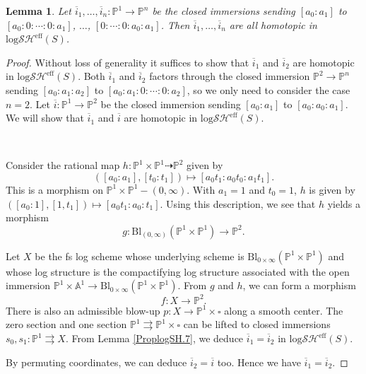 \documentclass[11pt, a4paper]{amsart}
\newtheorem{lem}[thm]{Lemma}
\theoremstyle{definition}
\numberwithin{equation}{subsection}
\renewcommand{\P}{\mathbb{P}}
\newcommand{\A}{\mathbb{A}}
\newcommand{\Blow}{{\mathrm{Bl}}}
\newcommand{\ol}{\overline}
\newcommand{\boxx}{\square}
\newcommand{\inflogSHS}{\mathrm{log}\mathcal{SH}^{\mathrm{eff}}}
\begin{document}
\begin{lem}
\label{Ori.6}
Let $\ol{i}_1,\ldots,\ol{i}_n\colon \P^1\to \P^n$ be the closed immersions sending $[a_0:a_1]$ to $[a_0:0:\cdots :0:a_1]$, $\ldots$, $[0:\cdots:0:a_0:a_1]$.
Then $\ol{i}_1,\ldots,\ol{i}_n$ are all homotopic in $\inflogSHS(S)$.
\end{lem}
\begin{proof}
Without loss of generality it suffices to show that $\ol{i}_1$ and $\ol{i}_2$ are homotopic in $\inflogSHS(S)$.
Both $\ol{i}_1$ and $\ol{i}_2$ factors through the closed immersion $\P^2\to \P^n$ sending $[a_0:a_1:a_2]$ to $[a_0:a_1:0:\cdots:0:a_2]$, so we only need to consider the case $n=2$.
Let $\ol{i}\colon \P^1\to \P^2$ be the closed immersion sending $[a_0:a_1]$ to $[a_0:a_0:a_1]$.
We will show that $\ol{i}_1$ and $\ol{i}$ are homotopic in $\inflogSHS(S)$.

\

Consider the rational map $h\colon \P^1\times \P^1 \dashrightarrow \P^2$ given by
\[
([a_0:a_1],[t_0:t_1])
\mapsto
[a_0t_1:a_0t_0:a_1t_1].
\]
This is a morphism on $\P^1\times \P^1-(0,\infty)$. With $a_1=1$ and $t_0=1$, $h$ is given by $([a_0:1],[1,t_1])\mapsto [a_0t_1:a_0:t_1]$.
Using this description,
we see that $h$ yields a morphism
\[
g\colon \Blow_{(0,\infty)}(\P^1\times \P^1)\to \P^2.
\]

Let $X$ be the fs log scheme whose underlying scheme is $\Blow_{0\times \infty}(\P^1\times \P^1)$ and whose log structure is the compactifying log structure associated with the open immersion $\P^1\times \A^1\to \Blow_{0\times \infty}(\P^1\times \P^1)$.
From $g$ and $h$, we can form a morphism
\[
f\colon X\to \P^2.
\]
There is also an admissible blow-up $p\colon X\to \P^1\times \boxx$ along a smooth center.
The zero section and one section $\P^1\rightrightarrows \P^1\times \boxx$ can be lifted to closed immersions $s_0,s_1\colon \P^1\rightrightarrows X$.
From Lemma \ref{ProplogSH.7}, we deduce $\ol{i}_1=\ol{i}_2$ in $\inflogSHS(S)$.

By permuting coordinates, we can deduce $\ol{i}_2=\ol{i}$ too.
Hence we have $\ol{i}_1=\ol{i}_2$.
\end{proof}
\end{document}
